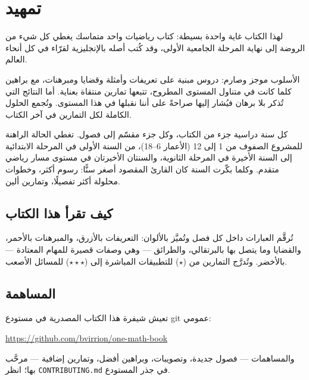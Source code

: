 \chapter{تمهيد}

لهذا الكتاب غاية واحدة بسيطة: كتاب رياضيات واحد متماسك يغطي كل شيء من
الروضة إلى نهاية المرحلة الجامعية الأولى، وقد كُتب أصله بالإنجليزية
لقرّاء في كل أنحاء العالم.

الأسلوب موجز وصارم: دروس مبنية على تعريفات وأمثلة وقضايا ومبرهنات، مع
براهين كلما كانت في متناول المستوى المطروح، تتبعها تمارين منتقاة بعناية.
أما النتائج التي تُذكر بلا برهان فيُشار إليها صراحةً على أننا نقبلها في
هذا المستوى. وتُجمع الحلول الكاملة لكل التمارين في آخر الكتاب.

كل سنة دراسية جزء من الكتاب، وكل جزء مقسّم إلى فصول. تغطي الحالة الراهنة
للمشروع الصفوف من 1 إلى 12 (الأعمار 6--18)، من السنة الأولى في المرحلة
الابتدائية إلى السنة الأخيرة في المرحلة الثانوية، والسنتان الأخيرتان في
مستوى مسار رياضي متقدم. وكلما بكّرت السنة كان القارئ المقصود أصغر سنًّا:
رسوم أكثر، وخطوات محلولة أكثر تفصيلًا، وتمارين ألين.

\section*{كيف تقرأ هذا الكتاب}

تُرقَّم العبارات داخل كل فصل وتُميَّز بالألوان: التعريفات بالأزرق،
والمبرهنات بالأحمر، والقضايا وما يتصل بها بالبرتقالي، والطرائق --- وهي
وصفات قصيرة للمهام المعتادة --- بالأخضر. وتُدرَّج التمارين من ($\star$)
للتطبيقات المباشرة إلى ($\star\star\star$) للمسائل الأصعب.

\section*{المساهمة}

تعيش شيفرة هذا الكتاب المصدرية في مستودع git عمومي:
\begin{center}
\url{https://github.com/bvirrion/one-math-book}
\end{center}
والمساهمات --- فصول جديدة، وتصويبات، وبراهين أفضل، وتمارين إضافية ---
مرحَّب بها؛ انظر \texttt{CONTRIBUTING.md} في جذر المستودع.
